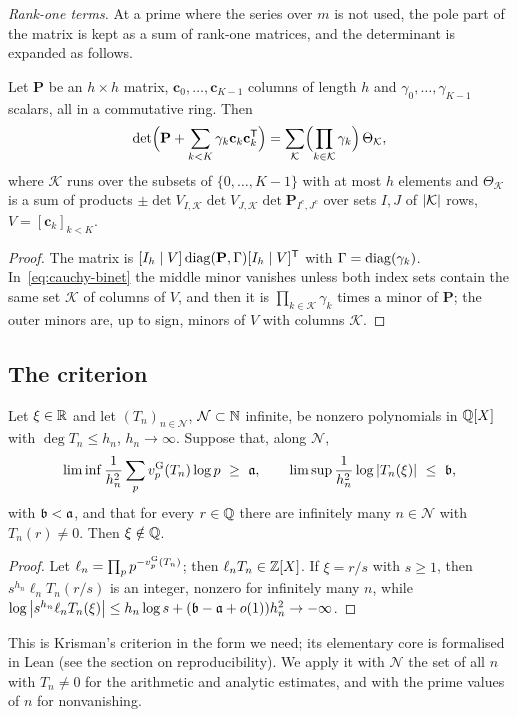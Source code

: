 \emph{Rank-one terms.} At a prime where the series over $m$ is not used, the pole part of the
matrix is kept as a sum of rank-one matrices, and the determinant is expanded as follows.

\begin{lemma}\label{lem:rank-one}
Let $\mathbf P$ be an $h\times h$ matrix, $\mathbf c_0,\dots,\mathbf c_{K-1}$ columns of
length $h$ and $\gamma_0,\dots,\gamma_{K-1}$ scalars, all in a commutative ring. Then
\[
  \det\Bigl(\mathbf P+\sum_{k<K}\gamma_k\mathbf c_k\mathbf c_k^{\mathsf T}\Bigr)
  =\sum_{\mathcal K}\Bigl(\prod_{k\in\mathcal K}\gamma_k\Bigr)\,\Theta_{\mathcal K},
\]
where $\mathcal K$ runs over the subsets of $\{0,\dots,K-1\}$ with at most $h$ elements and
$\Theta_{\mathcal K}$ is a sum of products $\pm\det V_{I,\mathcal K}\det V_{J,\mathcal K}
\det\mathbf P_{I^c,J^c}$ over sets $I,J$ of $\left\lvert \mathcal K\right\rvert$ rows, $V=[\mathbf c_k]_{k<K}$.
\end{lemma}

\begin{proof}
The matrix is $[I_h\mid V]\operatorname{diag}(\mathbf P,\Gamma)[I_h\mid V]^{\mathsf T}$ with
$\Gamma=\operatorname{diag}(\gamma_k)$. In~\eqref{eq:cauchy-binet} the middle minor vanishes unless both
index sets contain the same set $\mathcal K$ of columns of $V$, and then it is
$\prod_{k\in\mathcal K}\gamma_k$ times a minor of $\mathbf P$; the outer minors are, up to sign,
minors of $V$ with columns $\mathcal K$.
\end{proof}

\subsection{The criterion}\label{subsec:criterion}

\begin{proposition}\label{prop:criterion}
Let $\xi\in\mathbb{R}$ and let $(T_n)_{n\in\mathcal N}$, $\mathcal N\subset\mathbb{N}$ infinite, be nonzero
polynomials in $\mathbb{Q}[X]$ with $\deg T_n\le h_n$, $h_n\to\infty$. Suppose that, along $\mathcal N$,
\[
  \liminf\frac1{h_n^2}\sum_p\vG p(T_n)\log p\ \ge\ \aconst,\qquad
  \limsup\frac1{h_n^2}\log\abs{T_n(\xi)}\ \le\ \bconst,
\]
with $\mathfrak{b}<\mathfrak{a}$, and that for every $r\in\mathbb{Q}$ there are infinitely many $n\in\mathcal N$
with $T_n(r)\ne0$. Then $\xi\notin\mathbb{Q}$.
\end{proposition}

\begin{proof}
Let $\ell_n=\prod_pp^{-v_{p}^{\mathrm{G}}(T_n)}$; then $\ell_nT_n\in\mathbb{Z}[X]$. If $\xi=r/s$ with $s\ge1$, then
$s^{h_n}\ell_nT_n(r/s)$ is an integer, nonzero for infinitely many $n$, while
$\log\left\lvert s^{h_n}\ell_nT_n(\xi)\right\rvert\le h_n\log s+(\mathfrak{b}-\mathfrak{a}+o(1))h_n^2\to-\infty$.
\end{proof}

This is Krisman's criterion \cite[Prop.~3.1, Thm.~3.2]{Krisman2026chi2} in the form we need;
its elementary core is formalised in Lean (see the section on reproducibility). We apply it with
$\mathcal N$ the set of all $n$ with $T_n\ne0$ for the arithmetic and analytic estimates, and with
the prime values of $n$ for nonvanishing.
